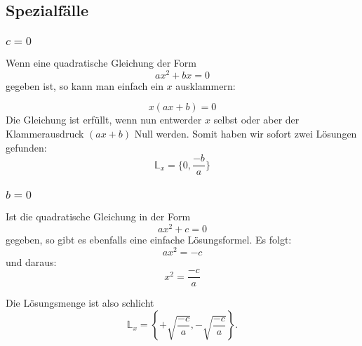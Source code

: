 \subsection{Spezialfälle}


\subsubsection{$c=0$}
Wenn eine quadratische Gleichung der Form
$$ax^2 +bx = 0$$
gegeben ist, so kann man einfach ein $x$ ausklammern:

$$x(ax+b)=0$$
 Die Gleichung ist erfüllt, wenn nun entwerder $x$ selbst oder aber
 der Klammerausdruck $(ax+b)$ Null werden. Somit haben wir sofort zwei
 Lösungen gefunden:
 $$\mathbb{L}_x=\{0, \frac{-b}{a}\}$$


 \subsubsection{$b=0$}
 Ist die quadratische Gleichung in der Form
 $$ax^2 + c = 0$$
 gegeben, so gibt es ebenfalls eine einfache Lösungsformel. Es folgt:
 $$ax^2 = -c$$
 und daraus:
 $$x^2 = \frac{-c}{a}$$

 Die Lösungsmenge ist also schlicht
 $$\mathbb{L}_x=\left\{ + \sqrt{\frac{-c}{a}}, -\sqrt{\frac{-c}{a}} \right\}.$$

